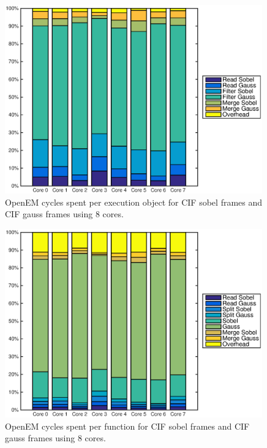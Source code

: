 \begin{figure}[h!]
    \begin{center}
        \includegraphics[width=0.99\textwidth]{images/openem_cifcif_8cores_eo.eps}
        \caption{OpenEM cycles spent per execution object for CIF sobel frames and CIF gauss frames using 8 cores.}
        \label{fig:oem8coreeo2}
    \end{center}
\end{figure}

\begin{figure}[h!]
    \begin{center}
        \includegraphics[width=0.99\textwidth]{images/openem_cifcif_8cores_func.eps}
        \caption{OpenEM cycles spent per function for CIF sobel frames and CIF gauss frames using 8 cores.}
        \label{fig:oem8corefunc2}
    \end{center}
\end{figure}

